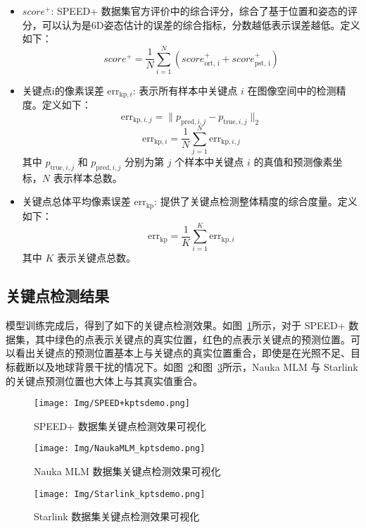 \begin{itemize}
	\item $score^+$: SPEED+ 数据集官方评价中的综合评分，综合了基于位置和姿态的评分，可以认为是6D姿态估计的误差的综合指标，分数越低表示误差越低。定义如下：
	\begin{equation}
		score^+ = \frac{1}{N}\sum\limits_{i=1}^N(score_{\text{ort, i}}^+ + score_{\text{pst, i}}^+)
	\end{equation}
	\item 关键点i的像素误差 $\text{err}_{\text{kp},i}$: 表示所有样本中关键点 $i$ 在图像空间中的检测精度。定义如下： 
	\begin{equation} 
		\text{err}_{\text{kp},i,j} = \| p_{\text{pred},i,j} - p_{\text{true},i,j} \|_2 
	\end{equation}
	\begin{equation} 
		\text{err}_{\text{kp},i} = \frac{1}{N} \sum\limits_{j=1}^{N} \text{err}_{\text{kp},i,j}
	\end{equation}
	其中 $p_{\text{true},i,j}$ 和 $p_{\text{pred},i,j}$ 分别为第 $j$ 个样本中关键点 $i$ 的真值和预测像素坐标，$N$ 表示样本总数。
	
	\item 关键点总体平均像素误差 $\text{err}_{\text{kp}}$: 提供了关键点检测整体精度的综合度量。定义如下： 
	\begin{equation} 
		\text{err}_{\text{kp}} = \frac{1}{K} \sum\limits_{i=1}^{K} \text{err}_{\text{kp},i}
	\end{equation}
	其中 $K$ 表示关键点总数。
\end{itemize}

\subsection{关键点检测结果}
模型训练完成后，得到了如下的关键点检测效果。如图~\ref{fig:SPEED+_kpts_demo}所示，对于 SPEED+ 数据集，其中绿色的点表示关键点的真实位置，红色的点表示关键点的预测位置。可以看出关键点的预测位置基本上与关键点的真实位置重合，即使是在光照不足、目标截断以及地球背景干扰的情况下。如图~\ref{fig:Nauka_MLM_kpts_demo}和图~\ref{fig:Starlink_kpts_demo}所示，Nauka MLM 与 Starlink 的关键点预测位置也大体上与其真实值重合。

\begin{figure}[htbp]
	\centering
	\texttt{[image: Img/SPEED+kptsdemo.png]}
	\caption{SPEED+ 数据集关键点检测效果可视化}
	\label{fig:SPEED+_kpts_demo}
	\vspace{0pt}
\end{figure}
\begin{figure}[htbp]
	\centering
	\texttt{[image: Img/NaukaMLM\_kptsdemo.png]}
	\caption{Nauka MLM 数据集关键点检测效果可视化}
	\label{fig:Nauka_MLM_kpts_demo}
	\vspace{0pt}
\end{figure}
\begin{figure}[htbp]
	\centering
	\texttt{[image: Img/Starlink\_kptsdemo.png]}
	\caption{Starlink 数据集关键点检测效果可视化}
	\label{fig:Starlink_kpts_demo}
	\vspace{0pt}
\end{figure}

